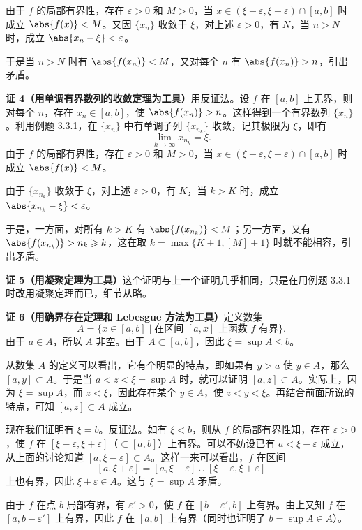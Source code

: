 \begin{xproof}
由于 $f$ 的局部有界性，存在 $\varepsilon>0$ 和 $M>0$，当 $x\in(\xi-\varepsilon,\xi+\varepsilon)\cap[a,b]$ 时成立 $\abs{f(x)}<M$。又因 $\{x_n\}$ 收敛于 $\xi$，对上述 $\varepsilon>0$，有 $N$，当 $n>N$ 时，成立 $\abs{x_n-\xi}<\varepsilon$。

于是当 $n>N$ 时有 $\abs{f(x_n)}<M$，又对每个 $n$ 有 $\abs{f(x_n)}>n$，引出矛盾。

\textbf{证 4（用单调有界数列的收敛定理为工具）}\quad 用反证法。设 $f$ 在 $[a,b]$ 上无界，则对每个 $n$，存在 $x_n\in[a,b]$，使 $\abs{f(x_n)}>n$。这样得到一个有界数列 $\{x_n\}$。利用例题 3.3.1，在 $\{x_n\}$ 中有单调子列 $\{x_{n_k}\}$ 收敛，记其极限为 $\xi$，即有
\[
  \lim_{k\to\infty}x_{n_k}=\xi.
\]
由于 $f$ 的局部有界性，存在 $\varepsilon>0$ 和 $M>0$，当 $x\in(\xi-\varepsilon,\xi+\varepsilon)\cap[a,b]$ 时成立 $\abs{f(x)}<M$。

由于 $\{x_{n_k}\}$ 收敛于 $\xi$，对上述 $\varepsilon>0$，有 $K$，当 $k>K$ 时，成立 $\abs{x_{n_k}-\xi}<\varepsilon$。

于是，一方面，对所有 $k>K$ 有 $\abs{f(x_{n_k})}<M$；另一方面，又有 $\abs{f(x_{n_k})}>n_k\geqslant k$，这在取 $k=\max\{K+1,[M]+1\}$ 时就不能相容，引出矛盾。

\textbf{证 5（用凝聚定理为工具）}\quad 这个证明与上一个证明几乎相同，只是在用例题 3.3.1 时改用凝聚定理而已，细节从略。

\textbf{证 6（用确界存在定理和 Lebesgue 方法为工具）}\quad 定义数集
\[
  A=\{x\in[a,b]\mid \text{在区间 }[a,x]\text{ 上函数 }f\text{ 有界}\}.
\]
由于 $a\in A$，所以 $A$ 非空。由于 $A\subset[a,b]$，因此 $\xi=\sup A\leqslant b$。

从数集 $A$ 的定义可以看出，它有个明显的特点，即如果有 $y>a$ 使 $y\in A$，那么 $[a,y]\subset A$。于是当 $a<z<\xi=\sup A$ 时，就可以证明 $[a,z]\subset A$。实际上，因为 $\xi=\sup A$，而 $z<\xi$，因此存在某个 $y\in A$，使 $z<y<\xi$。再结合前面所说的特点，可知 $[a,z]\subset A$ 成立。

现在我们证明有 $\xi=b$。反证法。如有 $\xi<b$，则从 $f$ 的局部有界性知，存在 $\varepsilon>0$，使 $f$ 在 $[\xi-\varepsilon,\xi+\varepsilon]$（$\subset[a,b]$）上有界。可以不妨设已有 $a<\xi-\varepsilon$ 成立，从上面的讨论知道 $[a,\xi-\varepsilon]\subset A$。这样一来可以看出，$f$ 在区间
\[
  [a,\xi+\varepsilon]=[a,\xi-\varepsilon]\cup[\xi-\varepsilon,\xi+\varepsilon]
\]
上也有界，因此 $\xi+\varepsilon\in A$。这与 $\xi=\sup A$ 矛盾。

由于 $f$ 在点 $b$ 局部有界，有 $\varepsilon'>0$，使 $f$ 在 $[b-\varepsilon',b]$ 上有界。由上又知 $f$ 在 $[a,b-\varepsilon']$ 上有界，因此 $f$ 在 $[a,b]$ 上有界（同时也证明了 $b=\sup A\in A$）。
\end{xproof}

